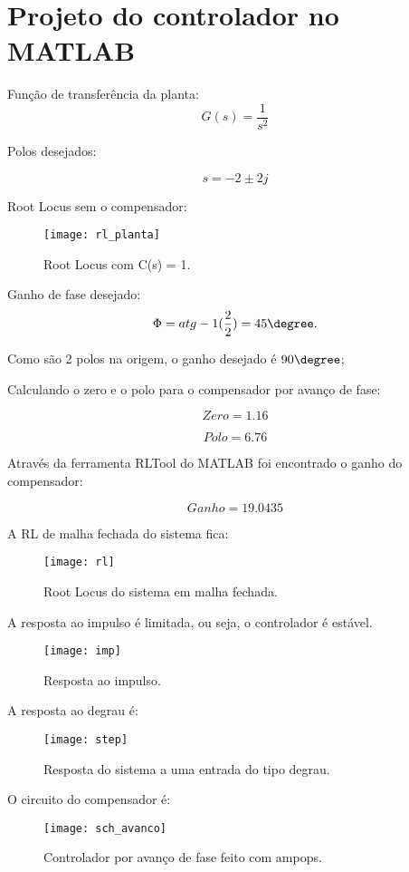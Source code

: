 \newpage

\section{Projeto do controlador no MATLAB}

Função de transferência da planta:
\[
    G(s) = \frac{1}{s^2}
\]

Polos desejados:

\[
    s = -2 \pm 2j
\]


Root Locus sem o compensador:

\begin{figure}[H]
    \centering
    \caption{Root Locus com C(s) = 1.}
    \texttt{[image: rl\_planta]}
    \label{f_rl_planta}
\end{figure}


Ganho de fase desejado:
\[
    \Phi = atg-1(\frac{2}{2}) = 45 \degree.
\]

Como são 2 polos na origem, o ganho desejado é $90\degree$;

Calculando o zero e o polo para o compensador por avanço de fase:

\[
    Zero = 1.16
\]

\[
    Polo = 6.76
\]

Através da ferramenta RLTool do MATLAB foi encontrado o ganho do compensador:

\[
    Ganho = 19.0435
\]

A RL de malha fechada do sistema fica:

\begin{figure}[H]
    \centering
    \caption{Root Locus do sistema em malha fechada.}
    \texttt{[image: rl]}
    \label{f_rl}
\end{figure}

A resposta ao impulso é limitada, ou seja, o controlador é estável.
\begin{figure}[H]
    \centering
    \caption{Resposta ao impulso.}
    \texttt{[image: imp]}
    \label{f_imp}
\end{figure}

A resposta ao degrau é:
\begin{figure}[H]
    \centering
    \caption{Resposta do sistema a uma entrada do tipo degrau.}
    \texttt{[image: step]}
    \label{f_step}
\end{figure}


O circuito do compensador é:
\begin{figure}[H]
    \centering
    \caption{Controlador por avanço de fase feito com ampops.}
    \texttt{[image: sch\_avanco]}
    \label{f_sch_avanco}
\end{figure}


